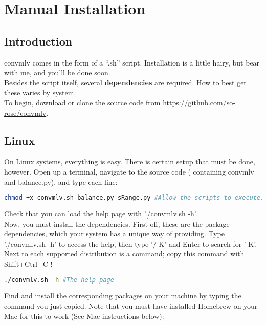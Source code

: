 \documentclass[a4paper,12pt]{article}
\begin{document}
\section{Manual Installation}

	\subsection{Introduction}
		
		convmlv comes in the form of a ``.sh'' script. Installation is a little hairy, but bear with me, and you'll be done soon.\\
		
		Besides the script itself, several \textbf{dependencies} are required. How to best get these varies by system.\\
		
		To begin, download or clone the source code from \url{https://github.com/so-rose/convmlv}.
		
	\subsection{Linux}
		On Linux systems, everything is easy. There is certain setup that must be done, however. Open up a terminal, navigate to the source code (
		containing convmlv and balance.py), and type each line:
		
\begin{lstlisting}[language=bash]
	chmod +x convmlv.sh balance.py sRange.py #Allow the scripts to execute.
\end{lstlisting}
		
		Check that you can load the help page with './convmlv.sh -h'.\\
		
		Now, you must install the dependencies. First off, these are the package
		dependencies, which your system has a unique way of providing. Type './convmlv.sh -h' to access the help, then type '/-K' and Enter to search for '-K'.
		Next to each supported distribution is a command; copy this command with Shift+Ctrl+C !

\begin{lstlisting}[language=bash]
	./convmlv.sh -h #The help page
\end{lstlisting}

		Find and install the corresponding packages on your machine by typing the command you just copied. Note that you must have installed
		Homebrew on your Mac for this to work (See Mac instructions below):
		
\end{document}
